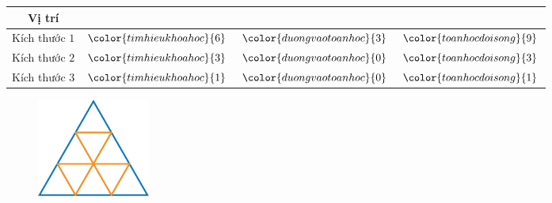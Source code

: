 \begin{multicols}{2}
	\begin{table}[H]
		\setlength{\tabcolsep}{2pt}
		\renewcommand{\arraystretch}{1.3}
		\begin{tabular}{|c|c|c|c|}
			\hline
			Vị trí & {\color{timhieukhoahoc}{Lên}}  & {\color{duongvaotoanhoc}{Xuống}} & {\color{toanhocdoisong}{Tổng}}\\
			\hline
			Kích thước $1$  & ${\color{timhieukhoahoc}{6}}$ &${\color{duongvaotoanhoc}{ 3}}$ &${\color{toanhocdoisong}{9}}$ \\
			\hline
			Kích thước $2$  & ${\color{timhieukhoahoc}{3}}$ & ${\color{duongvaotoanhoc}{0}}$ & ${\color{toanhocdoisong}{3}}$ \\
			\hline
			Kích thước $3$  & ${\color{timhieukhoahoc}{1}}$ & ${\color{duongvaotoanhoc}{0}}$ & ${\color{toanhocdoisong}{1}}$ \\
			\hline
		\end{tabular}
	\end{table}
	\begin{figure}[H]
		\centering
		\captionsetup{labelformat= empty, justification=centering}
		\includegraphics[width=0.18\textwidth]{Hinh24_1}
		\caption{}
		\vspace*{-10pt}
	\end{figure}
\end{multicols}
